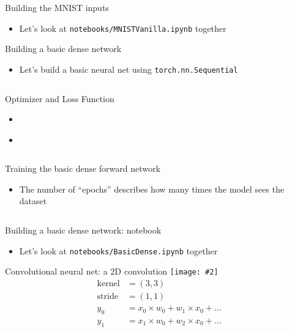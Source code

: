 \documentclass[hyperref={pdfpagelabels=false},12pt]{beamer}
\newcommand{\ig}[2]{\texttt{[image: \#2]}}
\newcommand{\code}[2]{\texttt{#2}}
\newcommand{\python}[1]{\code{python}{#1}}
\newcommand{\namedUrl}[2]{\href{#1}{\color{blue}{#2}}}
\newcommand{\pygment}[3]{\inputminted[bgcolor=lightgray,linenos,fontsize=#1]{#2}{#3}}
\begin{document}
\begin{frame}{Building the MNIST inputs}
  \begin{itemize}
    \item Let's look at \texttt{notebooks/MNISTVanilla.ipynb} together
  \end{itemize}
\end{frame}

\begin{frame}{Building a basic dense network}
  \begin{itemize}
    \item Let's build a basic neural net using \python{torch.nn.Sequential}
  \end{itemize}
  \pygment{\scriptsize}{python}{code/basic-dense-model.py}
\end{frame}

\begin{frame}{Optimizer and Loss Function}
  \begin{itemize}
    \item \namedUrl{https://arxiv.org/abs/1412.6980}{Adam Optimizer}
    \item \namedUrl{https://pytorch.org/docs/stable/nn.html\#crossentropyloss}{Cross Entropy Loss}
  \end{itemize}
  \pygment{\scriptsize}{python}{code/optimizer-loss-fn.py}
\end{frame}

\begin{frame}{Training the basic dense forward network}
  \begin{itemize}
    \item The number of ``epochs'' describes how many times the model sees the dataset
  \end{itemize}
  \pygment{\scriptsize}{python}{code/training-dense-model.py}
\end{frame}

\begin{frame}{Building a basic dense network: notebook}
  \begin{itemize}
    \item Let's look at \texttt{notebooks/BasicDense.ipynb} together
  \end{itemize}
\end{frame}

\begin{frame}{Convolutional neural net: a 2D convolution}
  \centering
  \ig{0.75}{figures/convolution.png}
  \begin{align*}
    \mathrm{kernel} &= (3, 3) \\
    \mathrm{stride} &= (1, 1) \\
    y_0 &= x_0 \times w_0 + w_1 \times x_0 + \dots \\
    y_1 &= x_1 \times w_0 + w_2 \times x_0 + \dots
  \end{align*}
\end{frame}
\end{document}

